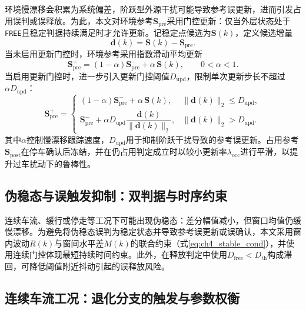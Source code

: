 环境慢漂移会积累为系统偏差，阶跃型外源干扰可能导致参考误更新，进而引发占用误判或误释放。为此，本文对环境参考$\mathbf{S}_{\mathrm{pre}}$采用门控更新：仅当外层状态处于\texttt{FREE}且稳定判据持续满足时才允许更新。记稳定点候选为$\mathbf{S}(k)$，定义候选增量
\begin{equation}
    \mathbf{d}(k)=\mathbf{S}(k)-\mathbf{S}_{\mathrm{pre}}.
\end{equation}
当未启用更新门控时，环境参考采用指数滑动平均更新
\begin{equation}
    \mathbf{S}_{\mathrm{pre}}^{+}=(1-\alpha)\mathbf{S}_{\mathrm{pre}}^{-}+\alpha\,\mathbf{S}(k),\qquad 0<\alpha<1.
\end{equation}
当启用更新门控时，进一步引入更新门控阈值$D_{\mathrm{upd}}$，限制单次更新步长不超过$\alpha D_{\mathrm{upd}}$：
\begin{equation}
    \mathbf{S}_{\mathrm{pre}}^{+}=
    \begin{cases}
        (1-\alpha)\mathbf{S}_{\mathrm{pre}}^{-}+\alpha\,\mathbf{S}(k), & \lVert\mathbf{d}(k)\rVert_2\le D_{\mathrm{upd}},\\
        \mathbf{S}_{\mathrm{pre}}^{-}+\alpha D_{\mathrm{upd}}\dfrac{\mathbf{d}(k)}{\lVert\mathbf{d}(k)\rVert_2}, & \lVert\mathbf{d}(k)\rVert_2> D_{\mathrm{upd}}.
    \end{cases}
\end{equation}
其中$\alpha$控制慢漂移跟踪速度，$D_{\mathrm{upd}}$用于抑制阶跃干扰导致的参考误更新。占用参考$\mathbf{S}_{\mathrm{post}}$在停车确认后冻结，并在仍占用判定成立时以较小更新率$\lambda_{\mathrm{occ}}$进行平滑，以提升过车扰动下的鲁棒性。

\subsection{伪稳态与误触发抑制：双判据与时序约束}
\label{subsec:ch4_pseudo}

连续车流、缓行或停走等工况下可能出现伪稳态：差分幅值减小，但窗口均值仍缓慢漂移。为避免将伪稳态误判为稳定状态并导致参考误更新或误确认，本文采用窗内波动$R(k)$与窗间水平差$M(k)$的联合约束（式\eqref{eq:ch4_stable_cond}），并使用连续门控体现最短持续时间约束。此外，在释放判定中使用$D_{\mathrm{free}}<D_{\mathrm{th}}$构成滞回，可降低阈值附近抖动引起的误释放风险。

\subsection{连续车流工况：退化分支的触发与参数权衡}
\label{subsec:ch4_degrade_param}

